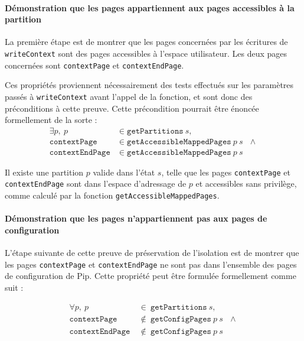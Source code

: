 			\paragraph{Démonstration que les pages appartiennent aux pages accessibles à la partition}

			La première étape est de montrer que les pages concernées par les écritures de \texttt{writeContext} sont des pages accessibles à l'espace utilisateur. Les deux pages concernées sont \texttt{contextPage} et \texttt{contextEndPage}. 

			Ces propriétés proviennent nécessairement des tests effectués sur les paramètres passés à \texttt{writeContext} avant l'appel de la fonction, et sont donc des préconditions à cette preuve. Cette précondition pourrait être énoncée formellement de la sorte :\\
			\begin{align*}
				\exists p,~p &\in \mathtt{getPartitions}~s,\\
				\mathtt{contextPage} &\in \mathtt{getAccessibleMappedPages}~p~s~~~\wedge\\
				\mathtt{contextEndPage} &\in \mathtt{getAccessibleMappedPages}~p~s
			\end{align*}

			\begin{property}
				Il existe une partition $p$ valide dans l'état $s$, telle que les pages \texttt{contextPage} et \texttt{contextEndPage} sont dans l'espace d'adressage de $p$ et accessibles sans privilège, comme calculé par la fonction \texttt{getAccessibleMappedPages}.
			\end{property}

			\paragraph{Démonstration que les pages n'appartiennent pas aux pages de configuration}

			L'étape suivante de cette preuve de préservation de l'isolation est de montrer que les pages \texttt{contextPage} et \texttt{contextEndPage} ne sont pas dans l'ensemble des pages de configuration de Pip. Cette propriété peut être formulée formellement comme suit :

			\begin{align*}
				\forall p,~p~&\in~\mathtt{getPartitions}~s,\\
				\mathtt{contextPage}~&\notin~\mathtt{getConfigPages}~p~s~~~\wedge\\
				\mathtt{contextEndPage}~&\notin~\mathtt{getConfigPages}~p~s
			\end{align*}

